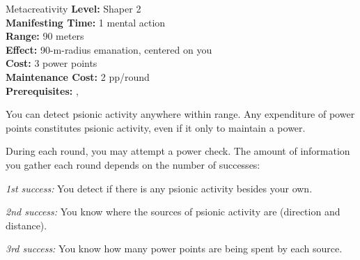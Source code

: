{Metacreativity}
{
	\textbf{Level:}
	Shaper 2\\
	\textbf{Manifesting Time:}
	1 mental action\\
	\textbf{Range:}
	90 meters\\
	\textbf{Effect:}
	90-m-radius emanation, centered on you\\
	\textbf{Cost:}
	3 power points\\
	\textbf{Maintenance Cost:}
	2 pp/round\\
	\textbf{Prerequisites:}
	, \\
}
{
	You can detect psionic activity anywhere within range. Any expenditure of power points constitutes psionic activity, even if it only to maintain a power.

	During each round, you may attempt a power check. The amount of information you gather each round depends on the number of successes:

	\textit{1st success:} You detect if there is any psionic activity besides your own.

	\textit{2nd success:} You know where the sources of psionic activity are (direction and distance).

	\textit{3rd success:} You know how many power points are being spent by each source.
}
